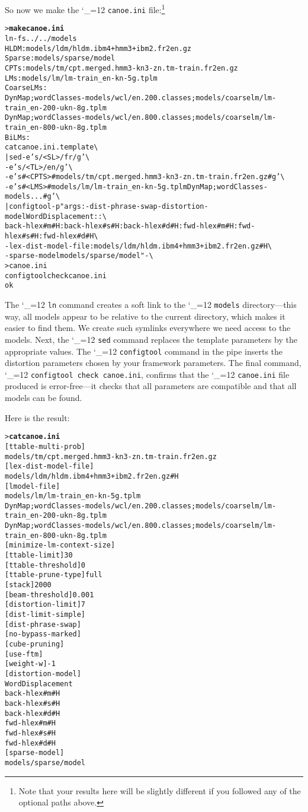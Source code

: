 \documentclass[11pt,letterpaper]{article}
\newcommand{\bs}{\textbackslash{}}
\def\code{\begingroup\catcode`\_=12 \codex}
\newcommand{\codex}[1]{\texttt{#1}\endgroup}
\begin{document}
So now we make the \code{canoe.ini} file:\footnote{Note that your results here
will be slightly different if you followed any of the optional paths above.}
\begin{small}
\begin{alltt}
   > \textbf{make canoe.ini}
   ln -fs ../../models
   HLDM: models/ldm/hldm.ibm4+hmm3+ibm2.fr2en.gz
   Sparse: models/sparse/model
   CPTs: models/tm/cpt.merged.hmm3-kn3-zn.tm-train.fr2en.gz
   LMs: models/lm/lm-train_en-kn-5g.tplm
   Coarse LMs:
      DynMap;wordClasses-models/wcl/en.200.classes;models/coarselm/lm-train_en-200-ukn-8g.tplm
      DynMap;wordClasses-models/wcl/en.800.classes;models/coarselm/lm-train_en-800-ukn-8g.tplm  
   BiLMs:
   cat canoe.ini.template \bs
      | sed -e 's/<SL>/fr/g' \bs
            -e 's/<TL>/en/g' \bs
            -e 's#<CPTS>#models/tm/cpt.merged.hmm3-kn3-zn.tm-train.fr2en.gz#g' \bs
            -e 's#<LMS>#models/lm/lm-train_en-kn-5g.tplm DynMap;wordClasses-models...#g' \bs
      | configtool -p "args: -dist-phrase-swap -distortion-model WordDisplacement::\bs
        back-hlex#m#H:back-hlex#s#H:back-hlex#d#H:fwd-hlex#m#H:fwd-hlex#s#H:fwd-hlex#d#H \bs
        -lex-dist-model-file :models/ldm/hldm.ibm4+hmm3+ibm2.fr2en.gz#H \bs
        -sparse-model models/sparse/model " - \bs
      > canoe.ini
   configtool check canoe.ini
   ok
\end{alltt}
\end{small}
The \code{ln} command creates a soft link to the \code{models} directory---this way, all
models appear to be relative to the current directory, which makes it easier to
find them.  We create such symlinks everywhere we need access to the models.
Next, the \code{sed} command replaces the template parameters by the appropriate
values.  The \code{configtool} command in the pipe inserts the distortion parameters
chosen by your framework parameters.  The final command, \code{configtool check
canoe.ini}, confirms that the \code{canoe.ini} file produced is error-free---it
checks that all parameters are compatible and that all models can be found.

Here is the result:
\begin{small}
\begin{alltt}
   > \textbf{cat canoe.ini}
   [ttable-multi-prob]
      models/tm/cpt.merged.hmm3-kn3-zn.tm-train.fr2en.gz
   [lex-dist-model-file]
      models/ldm/hldm.ibm4+hmm3+ibm2.fr2en.gz#H
   [lmodel-file]
      models/lm/lm-train_en-kn-5g.tplm
      DynMap;wordClasses-models/wcl/en.200.classes;models/coarselm/lm-train_en-200-ukn-8g.tplm
      DynMap;wordClasses-models/wcl/en.800.classes;models/coarselm/lm-train_en-800-ukn-8g.tplm
   [minimize-lm-context-size]
   [ttable-limit] 30
   [ttable-threshold] 0
   [ttable-prune-type] full
   [stack] 2000
   [beam-threshold] 0.001
   [distortion-limit] 7
   [dist-limit-simple]
   [dist-phrase-swap]
   [no-bypass-marked]
   [cube-pruning]
   [use-ftm]
   [weight-w] -1
   [distortion-model]
      WordDisplacement
      back-hlex#m#H
      back-hlex#s#H
      back-hlex#d#H
      fwd-hlex#m#H
      fwd-hlex#s#H
      fwd-hlex#d#H
   [sparse-model]
      models/sparse/model
\end{alltt}
\end{small}
\end{document}
